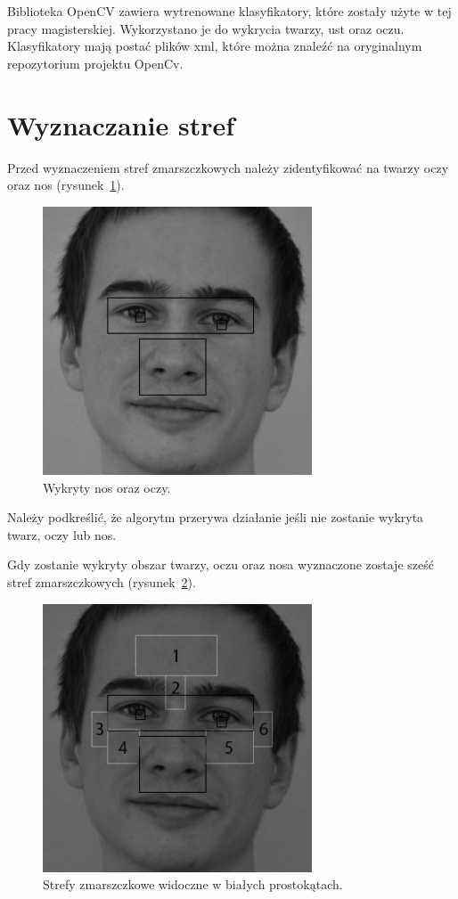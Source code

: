 \documentclass[a4paper,twoside,12pt]{book}
\begin{document}
    Biblioteka OpenCV zawiera wytrenowane klasyfikatory, które zostały użyte w tej pracy magisterskiej.
    Wykorzystano
    je do wykrycia twarzy, ust oraz oczu.
    Klasyfikatory mają postać plików xml, które można znaleźć na oryginalnym
    repozytorium projektu OpenCv.

    \section{Wyznaczanie stref}\label{sec:wyznaczanieStref}
    Przed wyznaczeniem stref zmarszczkowych należy zidentyfikować na twarzy oczy oraz nos
    (rysunek~\ref{fig.wykrywanieOczuNosa}).
    \begin{figure}
        \centering
        \includegraphics[width=8cm]{Obrazy/wykrywanieOczuNosa.jpg}
        \caption{Wykryty nos oraz oczy.}
        \label{fig.wykrywanieOczuNosa}
    \end{figure}


    Należy podkreślić, że algorytm przerywa działanie jeśli nie zostanie wykryta twarz, oczy lub nos.

    Gdy zostanie wykryty obszar twarzy, oczu oraz nosa wyznaczone zostaje sześć stref zmarszczkowych
    (rysunek~\ref{fig.wykrywanieStrefZmarszczkowych}).

    \begin{figure}
        \centering
        \includegraphics[width=8cm]{Obrazy/strefyZmarszczkowe.jpg}
        \caption{Strefy zmarszczkowe widoczne w białych prostokątach.}
        \label{fig.wykrywanieStrefZmarszczkowych}
    \end{figure}
\end{document}
